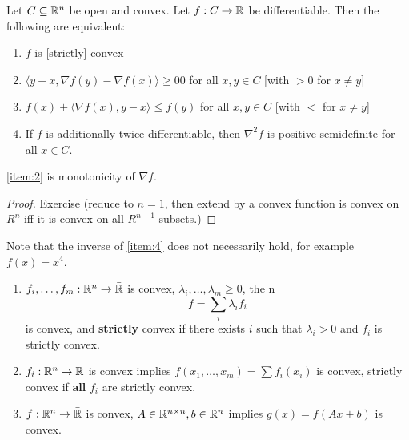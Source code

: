\begin{thm}
  \label{defn:convexity:6}
  Let $C \subseteq \mathbb{R}^{n}$ be open and convex.  Let $f: C \rightarrow
  \mathbb{R}$ be differentiable. Then the following are equivalent:
  \begin{enumerate}
  \item \label{item:1} $f$ is [strictly] convex
  \item \label{item:2} $\langle y - x, \nabla f(y) - \nabla f(x) \rangle \geq 0 0$ for all
    $x, y \in C$ [with $> 0$ for $x \neq y$]
  \item \label{item:3} $f(x) + \langle \nabla f(x), y - x \rangle \leq f(y)$ for all
    $x, y \in C$ [with $<$ for $x \neq y$]
  \item \label{item:4} If $f$ is additionally twice differentiable, then $\nabla^{2}
    f$ is positive semidefinite for all $x \in C$.
  \end{enumerate}

  \ref{item:2} is monotonicity of $\nabla f$.
\end{thm}

\begin{proof}
  Exercise (reduce to $n=1$, then extend by a convex function is
  convex on $R^{n}$ iff it is convex on all $R^{n-1}$ subsets.)
\end{proof}

\begin{remark}
  Note that the inverse of \ref{item:4} does not necessarily hold, for
  example $f(x) = x^{4}$.
\end{remark}

\begin{proposition}
  \begin{enumerate}
  \item $f_{i}, \dots, f_{m}: \mathbb{R}^{n} \rightarrow \bar {\mathbb{R}}$ is convex,
    $\lambda_{i}, \dots, \lambda_{m} \geq 0$, the n
    \begin{equation}
      \label{eq:20}
      f = \sum_{i} \lambda_{i} f_{i}
    \end{equation} is convex, and \textbf{strictly} convex if there
    exists $i$ such that $\lambda_{i} > 0$ and $f_{i}$ is strictly convex.
  \item $f_{i}: \mathbb{R}^{n} \rightarrow \mathbb{R}$ is convex implies $f(x_{1},
    \dots, x_{m}) = \sum f_{i}(x_{i})$ is convex, strictly convex if
    \textbf{all} $f_i$ are strictly convex.
  \item $f: \mathbb{R}^{n} \rightarrow \bar {\mathbb{R}}$ is convex, $A \in \mathbb{R}^{n \times
    n}, b \in \mathbb{R}^{n}$ implies $g(x) = f(Ax + b)$ is convex.
  \end{enumerate}
\end{proposition}

